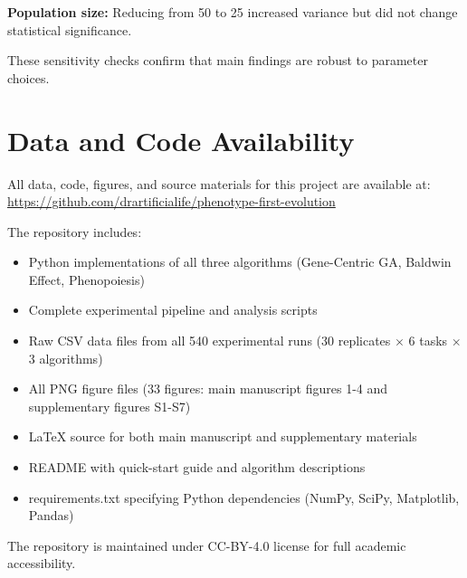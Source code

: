 \documentclass[12pt]{article}
\begin{document}
\textbf{Population size:} Reducing from 50 to 25 increased variance but did not change statistical significance.

These sensitivity checks confirm that main findings are robust to parameter choices.

\section*{Data and Code Availability}

All data, code, figures, and source materials for this project are available at: \url{https://github.com/drartificialife/phenotype-first-evolution}

The repository includes:
\begin{itemize}
\item Python implementations of all three algorithms (Gene-Centric GA, Baldwin Effect, Phenopoiesis)
\item Complete experimental pipeline and analysis scripts
\item Raw CSV data files from all 540 experimental runs (30 replicates $\times$ 6 tasks $\times$ 3 algorithms)
\item All PNG figure files (33 figures: main manuscript figures 1-4 and supplementary figures S1-S7)
\item LaTeX source for both main manuscript and supplementary materials
\item README with quick-start guide and algorithm descriptions
\item requirements.txt specifying Python dependencies (NumPy, SciPy, Matplotlib, Pandas)
\end{itemize}

\noindent The repository is maintained under CC-BY-4.0 license for full academic accessibility.
\end{document}
